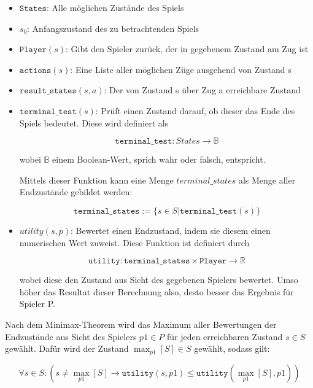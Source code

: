 \begin{itemize}
\item \textbf{$\mathtt{States}$}: Alle möglichen Zustände des Spiels
\item \textbf{$s_0$}: Anfangszustand des zu betrachtenden Spiels
\item \textbf{$\mathtt{Player}(s)$}: Gibt den Spieler zurück, der in gegebenem Zustand am Zug ist
\item \textbf{$\mathtt{actions}(s)$}: Eine Liste aller möglichen Züge ausgehend von Zustand s
\item \textbf{$\mathtt{result\_states}(s,a)$}: Der von Zustand s über Zug a erreichbare Zustand
\item \textbf{$\mathtt{terminal\_test}(s)$}: Prüft einen Zustand darauf, ob dieser das Ende des Spiels bedeutet. Diese wird definiert als

\begin{equation}
\mathtt{terminal\_test} : States \rightarrow \mathbb{B}
\end{equation}

wobei $\mathbb{B}$ einem Boolean-Wert, sprich wahr oder falsch, entspricht.

Mittels dieser Funktion kann eine Menge $terminal\_states$ als Menge aller Endzustände gebildet werden:

\begin{equation}
\mathtt{terminal\_states} := \{s \in S | \mathtt{terminal\_test}(s)\}
\end{equation}

\item \textbf{$utility(s, p)$}: Bewertet einen Endzustand, indem sie diesem einen numerischen Wert zuweist. Diese Funktion ist definiert durch

\begin{equation}
\mathtt{utility} : \mathtt{terminal\_states} \times \mathtt{Player} \rightarrow \mathbb{R}
\end{equation}

wobei diese den Zustand aus Sicht des gegebenen Spielers bewertet. Umso höher das Resultat dieser Berechnung also, desto besser das Ergebnis für Spieler P.
\end{itemize}

Nach dem Minimax-Theorem wird das Maximum aller Bewertungen der Endzustände aus Sicht des Spielers $p1 \in P$ für jeden erreichbaren Zustand $s \in S$ gewählt. Dafür wird der Zustand $\max_{p1}[S] \in S$ gewählt, sodass gilt:

\begin{equation}
\forall s \in S : (s \neq \max_{p1}[S] \rightarrow \mathtt{utility}(s, p1) \leq \mathtt{utility}(\max_{p1}[S], p1))
\end{equation}

